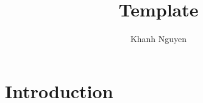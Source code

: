 \documentclass[12pt]{article}
\title{Template}
\author{Khanh Nguyen}
\date{}
\begin{document}
\maketitle
\thispagestyle{fancy}

\section{Introduction}
\end{document}
